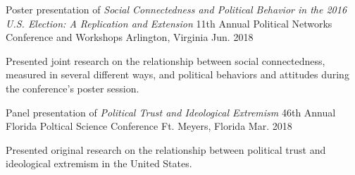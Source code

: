 

\begin{cventries}

\cventry
  {Poster presentation of \emph{Social Connectedness and Political Behavior in the 2016 U.S. Election: A Replication and Extension}} %
  {11th Annual Political Networks Conference and Workshops} %
  {Arlington, Virginia} %
  {Jun. 2018} %
  {
    \begin{cvitems} %
      \item {Presented joint research on the relationship between social connectedness, measured in several different ways, and political behaviors and attitudes during the conference's poster session.}
    \end{cvitems}
  }

  \cventry
    {Panel presentation of \emph{Political Trust and Ideological Extremism}} %
    {46th Annual Florida Poltical Science Conference} %
    {Ft. Meyers, Florida} %
    {Mar. 2018} %
    {
      \begin{cvitems} %
        \item {Presented original research on the relationship between political trust and ideological extremism in the United States.}
      \end{cvitems}
    }


\end{cventries}
